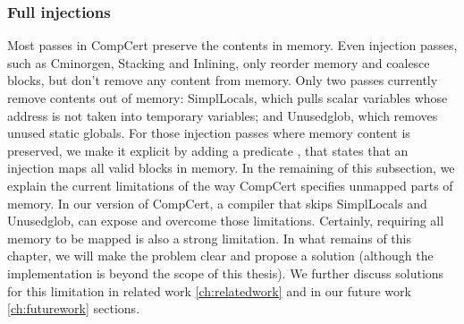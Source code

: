 %

   
   
\subsubsection{Full injections} Most passes in CompCert preserve the contents in memory. Even injection passes, such as Cminorgen, Stacking and Inlining, only reorder memory and coalesce blocks, but don't remove any content from memory. Only two passes currently remove contents out of memory: SimplLocals, which pulls scalar variables whose address is not taken into temporary variables; and Unusedglob, which removes unused static globals. For those injection passes where memory content is preserved, we make it explicit by adding a predicate , that states that an injection maps all valid blocks in memory. In the remaining of this subsection, we explain the current limitations of the way CompCert specifies unmapped parts of memory. In our version of CompCert, a compiler that skips SimplLocals and Unusedglob, can expose  and overcome those limitations. Certainly, requiring all memory to be mapped is also a strong limitation. In what remains of this chapter, we will make the problem clear and propose a solution (although the implementation is beyond the scope of this thesis). We further discuss solutions for this limitation in related work \autoref{ch:relatedwork} and in our future work \autoref{ch:futurework} sections.

